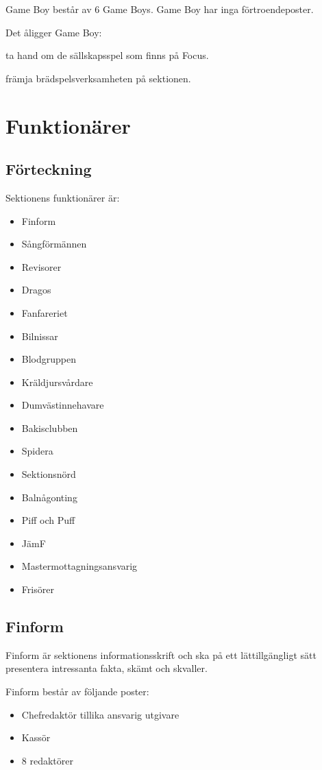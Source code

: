 \documentclass{styrdokument}
\begin{document}
\? Game Boy består av 6 Game Boys. Game Boy har inga förtroendeposter.
	    
\? Det åligger Game Boy:
\begin{aligganden}
    \item ta hand om de sällskapsspel som finns på Focus.
	\item främja brädspelsverksamheten på sektionen.
\end{aligganden}

\section{Funktionärer}
\subsection{Förteckning}
\? Sektionens funktionärer är:
\begin{itemize}
    \item Finform
	\item Sångförmännen
	\item Revisorer
	\item Dragos
	\item Fanfareriet
	\item Bilnissar
	\item Blodgruppen
	\item Kräldjursvårdare
	\item Dumvästinnehavare
	\item Bakisclubben
	\item Spidera
	\item Sektionsnörd
	\item Balnågonting
	\item Piff och Puff
	\item JämF
	\item Mastermottagningsansvarig
	\item Frisörer
\end{itemize}

\subsection{Finform}
\? Finform är sektionens informationsskrift och ska på ett lättillgängligt sätt presentera intressanta fakta, skämt och skvaller. 

\? Finform består av följande poster:
\begin{itemize}
    \item Chefredaktör tillika ansvarig utgivare
	\item Kassör
	\item 8 redaktörer
\end{itemize}
\end{document}
